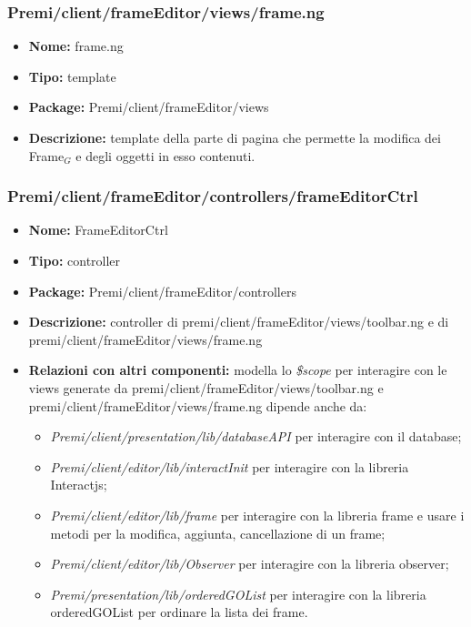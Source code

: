 \subsubsection{Premi/client/frameEditor/views/frame.ng}
\begin{itemize}
  \item[] \textbf{Nome:} frame.ng
  \item[] \textbf{Tipo:} template
  \item[] \textbf{Package:} Premi/client/frameEditor/views
  \item[] \textbf{Descrizione:} template della parte di pagina che permette la modifica dei Frame$_G$ e degli oggetti in esso contenuti.
\end{itemize}
\subsubsection{Premi/client/frameEditor/controllers/frameEditorCtrl}
\begin{itemize}
  \item[] \textbf{Nome:} FrameEditorCtrl
  \item[] \textbf{Tipo:} controller
  \item[] \textbf{Package:} Premi/client/frameEditor/controllers
  \item[] \textbf{Descrizione:} controller di premi/client/frameEditor/views/toolbar.ng e di premi/client/frameEditor/views/frame.ng
  \item[] \textbf{Relazioni con altri componenti:} modella lo \textit{\$scope} per interagire con le views generate da premi/client/frameEditor/views/toolbar.ng e premi/client/frameEditor/views/frame.ng dipende anche da:
 \begin{itemize} 
	\item \textit{Premi/client/presentation/lib/databaseAPI} per interagire con il database;  
	\item \textit{Premi/client/editor/lib/interactInit} per interagire con la libreria Interactjs;
	\item \textit{Premi/client/editor/lib/frame} per interagire con la libreria frame e usare i metodi per la modifica, aggiunta, cancellazione di un frame;
	\item \textit{Premi/client/editor/lib/Observer} per interagire con la libreria observer; 
	\item \textit{Premi/presentation/lib/orderedGOList} per interagire con la libreria orderedGOList per ordinare la lista dei frame. 
  \end{itemize} 
\end{itemize}

